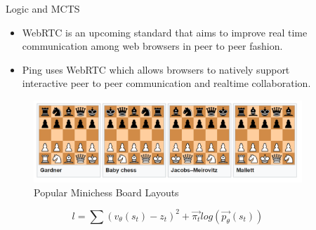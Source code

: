 \documentclass[final]{beamer}
\newlength{\sepwid}
\newlength{\onecolwid}
\newlength{\twocolwid}
\begin{document}
\begin{frame}[t]
\begin{columns}[t]
\begin{column}{\onecolwid}
\begin{block}{Logic and MCTS}

\begin{itemize}
\item WebRTC is an upcoming standard that aims to improve real time communication among web browsers in peer to peer fashion.
\item Ping uses WebRTC which allows browsers to natively support interactive peer to peer communication and realtime collaboration.
\end{itemize}

\begin{figure}
\includegraphics[width=1.0\linewidth]{minichess.png}
\caption{Popular Minichess Board Layouts}
\end{figure}


\[ l = \sum (v_{\theta}(s_{t}) - z_{t})^{2}+ \vec{\pi_{t}} log(\vec{p_{\theta}}(s_{t}))  \]


\end{block}



\end{column} %

\begin{column}{\sepwid}\end{column} %

\begin{column}{\twocolwid} %

\begin{columns}[t,totalwidth=\twocolwid] %

\begin{column}{\onecolwid}\vspace{-.6in} %



\end{column}
\end{columns}
\end{column}
\end{columns}
\end{frame}
\end{document}
